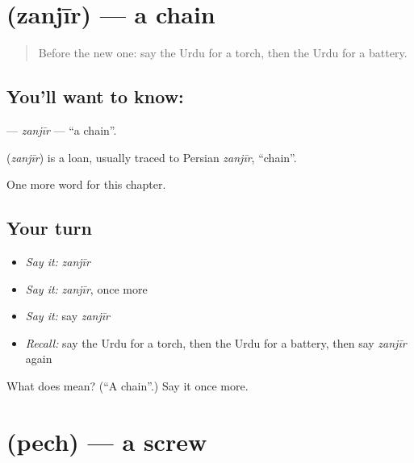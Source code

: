 \section[\texorpdfstring{\ur{زنجیر} (zanjīr)}{زنجیر (zanjīr)}]{ (zanjīr) — a chain}

\label{lesson:UR-C232-zanjir}



\begin{quote}
Before the new one: say the Urdu for a torch, then the Urdu for a battery.
\end{quote}

\subsection*{You'll want to know: }
\textbf{} — \emph{zanjīr} — \textquotedblleft{}a chain\textquotedblright{}.

\begin{cousinweb}
\textbf{} (\emph{zanjīr}) is a loan, usually traced to Persian \emph{zanjīr}, \textquotedblleft{}chain\textquotedblright{}.
\end{cousinweb}

\begin{grammarlens}[title={What you've built}]
One more word for this chapter.
\end{grammarlens}

\subsection*{Your turn}
\begin{itemize}
\raggedright
  \item \emph{Say it:} \emph{zanjīr}
  \item \emph{Say it:} \emph{zanjīr}, once more
  \item \emph{Say it:} say \emph{zanjīr}
  \item \emph{Recall:} say the Urdu for a torch, then the Urdu for a battery, then say \emph{zanjīr} again
\end{itemize}

\begin{tcolorbox}[breakable,colback=teal!4,colframe=teal!35!black,title={Before you move on}]
What does  mean? (\textquotedblleft{}A chain\textquotedblright{}.) Say it once more.
\end{tcolorbox}
\section[\texorpdfstring{\ur{پیچ} (pech)}{پیچ (pech)}]{ (pech) — a screw}

